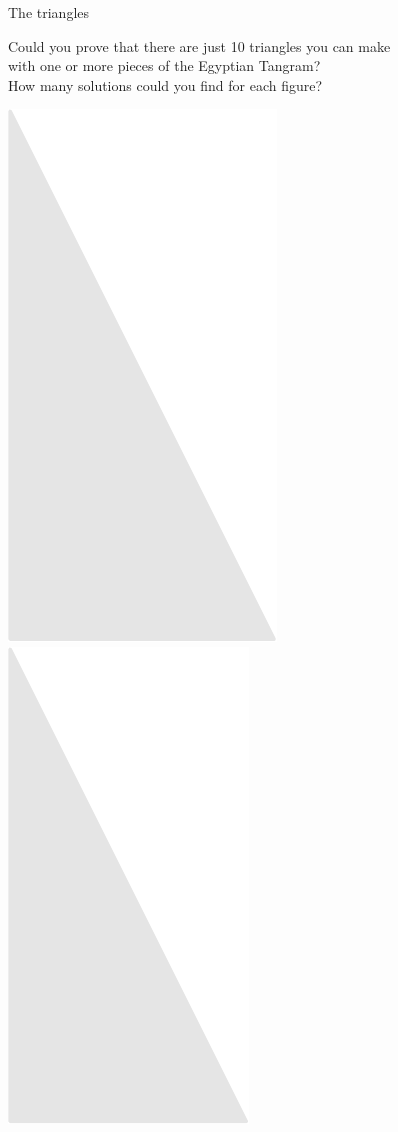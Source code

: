 \documentclass[14pt]{beamer}
\begin{document}

    \begin{frame}{The triangles}

        \vspace{-0.5em}
        \begin{center}
            {\small Could you prove that there are just 10 triangles you can make\\with one or more pieces of the Egyptian Tangram?\\How many solutions could you find for each figure?}

            \bigskip\bigskip

            \includegraphics[scale=0.3]{figures/figure024f.pdf}\quad
            \includegraphics[scale=0.3]{figures/figure024e.pdf}\quad

\end{center}
\end{frame}
\end{document}
